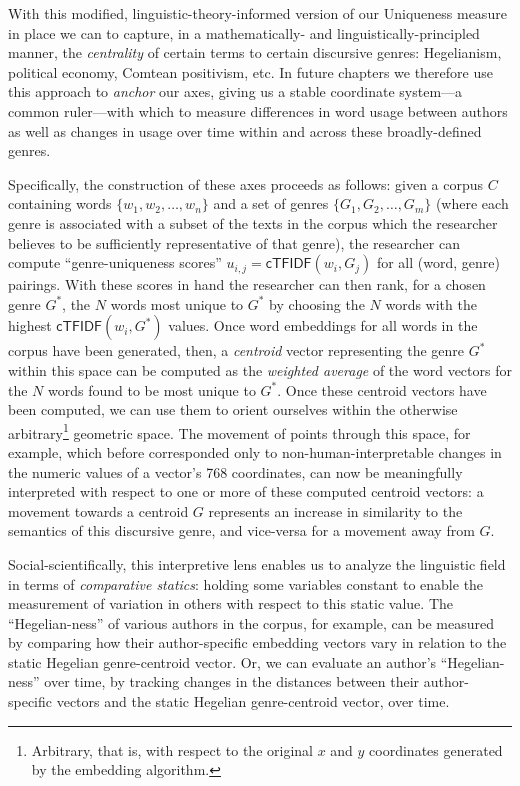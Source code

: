 \documentclass[11pt]{article}
\begin{document}
With this modified, linguistic-theory-informed version of our \textsf{Uniqueness} measure in place we can to capture, in a mathematically- and linguistically-principled manner, the \textit{centrality} of certain terms to certain discursive genres: Hegelianism, political economy, Comtean positivism, etc. In future chapters we therefore use this approach to \textit{anchor} our axes, giving us a stable coordinate system---a common ruler---with which to measure differences in word usage between authors as well as changes in usage over time within and across these broadly-defined genres.

Specifically, the construction of these axes proceeds as follows: given a corpus $C$ containing words $\{w_1, w_2, \ldots, w_n\}$ and a set of genres $\{G_1, G_2, \ldots, G_m\}$ (where each genre is associated with a subset of the texts in the corpus which the researcher believes to be sufficiently representative of that genre), the researcher can compute ``genre-uniqueness scores'' $u_{i,j} = \textsf{cTFIDF}(w_i,G_j)$ for all (word, genre) pairings. With these scores in hand the researcher can then rank, for a chosen genre $G^*$, the $N$ words most unique to $G^*$ by choosing the $N$ words with the highest $\textsf{cTFIDF}(w_i,G^*)$ values. Once word embeddings for all words in the corpus have been generated, then, a \textit{centroid} vector representing the genre $G^*$ within this space can be computed as the \textit{weighted average} of the word vectors for the $N$ words found to be most unique to $G^*$. Once these centroid vectors have been computed, we can use them to orient ourselves within the otherwise arbitrary\footnote{Arbitrary, that is, with respect to the original $x$ and $y$ coordinates generated by the embedding algorithm.} geometric space. The movement of points through this space, for example, which before corresponded only to non-human-interpretable changes in the numeric values of a vector's 768 coordinates, can now be meaningfully interpreted with respect to one or more of these computed centroid vectors: a movement towards a centroid $G$ represents an increase in similarity to the semantics of this discursive genre, and vice-versa for a movement away from $G$. 

Social-scientifically, this interpretive lens enables us to analyze the linguistic field in terms of \textit{comparative statics}: holding some variables constant to enable the measurement of variation in others with respect to this static value. The ``Hegelian-ness'' of various authors in the corpus, for example, can be measured by comparing how their author-specific embedding vectors vary in relation to the static Hegelian genre-centroid vector. Or, we can evaluate an author's ``Hegelian-ness'' over time, by tracking changes in the distances between their author-specific vectors and the static Hegelian genre-centroid vector, over time.
\end{document}
